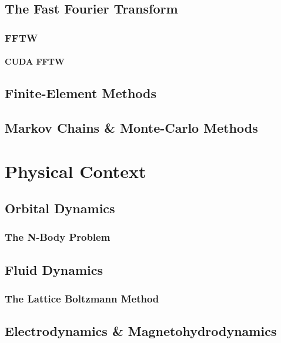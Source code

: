 \documentclass{report}
\begin{document}
    \section{The Fast Fourier Transform}

        \subsection{FFTW}

            \subsubsection{CUDA FFTW}

    \section{Finite-Element Methods}

    \section{Markov Chains \& Monte-Carlo Methods}

\chapter{Physical Context}

    \section{Orbital Dynamics}

        \subsection{The N-Body Problem}

    \section{Fluid Dynamics}

        \subsection{The Lattice Boltzmann Method}

    \section{Electrodynamics \& Magnetohydrodynamics}
\end{document}

